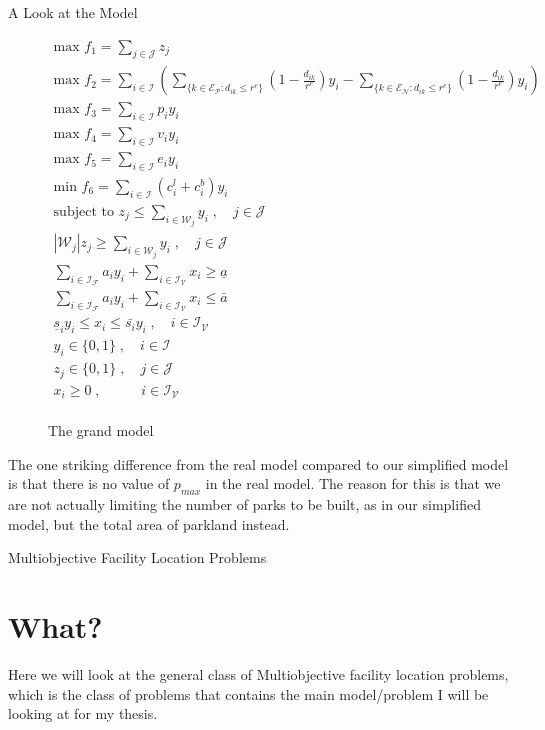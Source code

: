 \documentclass[12pt]{pom_thesis}
\theoremstyle{definition}
\begin{document}
\begin{chapter}{A Look at the Model}
\begin{figure}
\begin{gather*}
\textrm{max } f_1 = \sum_{j \in \mathcal{J}} z_j \\
\textrm{max } f_2 = \sum_{i \in \mathcal{I}}  \left( \sum_{\{k \in \mathcal{E_P}: d_{ik} \leq r^e  \}} \left( 1-\frac{d_{ik}}{r^e} \right) y_i  -   \sum_{\{k \in \mathcal{E_N}: d_{ik} \leq r^e  \}} \left( 1-\frac{d_{ik}}{r^e} \right) y_i   \right) \\
\textrm{max } f_3 = \sum_{i \in \mathcal{I}} p_iy_i \\
\textrm{max } f_4 = \sum_{i \in \mathcal{I}} v_iy_i \\
\textrm{max } f_5 = \sum_{i \in \mathcal{I}} e_iy_i \\
\textrm{min } f_6 = \sum_{i \in \mathcal{I}} (c_i^l + c_i^b)y_i \\
\textrm{subject to } z_j \leq \sum_{i \in \mathcal{W}_j} y_i \; , \quad j \in \mathcal{J} \\
\left|\mathcal{W}_j\right|z_j \geq \sum_{i \in \mathcal{W}_j} y_i \; , \quad j \in \mathcal{J} \\
\sum_{i \in \mathcal{I_F}} a_iy_i + \sum_{i \in \mathcal{I_V}} x_i \geq \underline{a} \\
\sum_{i \in \mathcal{I_F}} a_iy_i + \sum_{i \in \mathcal{I_V}} x_i \leq \bar{a} \\
\underline{s}_iy_i \leq  x_i \leq \bar{s_i}y_i \;, \quad i \in \mathcal{I_V} \\
y_i \in \{0,1\} \; , \quad i \in \mathcal{I} \\
z_j \in \{0,1\} \; , \quad j \in \mathcal{J} \\
x_i \geq 0 \; , \quad\quad\;\;\; i \in \mathcal{I_V} \\
\end{gather*}
\caption{The grand model}
\label{real-model}
\end{figure}
The one striking difference from the real model compared to our simplified model is that there is no value of $p_{max}$ in the real model. The reason for this is that we are not actually limiting the number of parks to be built, as in our simplified model, but the total area of parkland instead. 
\end{chapter}

\begin{chapter}{Multiobjective Facility Location Problems}
\section{What?}
Here we will look at the general class of Multiobjective facility location problems, which is the class of problems that contains the main model/problem I will be looking at for my thesis. 
\end{chapter}
\end{document}
